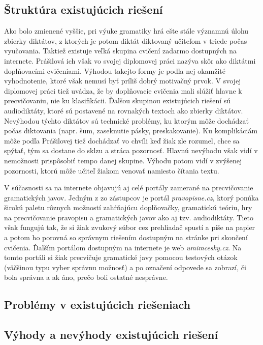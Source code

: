 \documentclass[12pt,oneside]{fithesis2}
\begin{document}
       		\subsection{Štruktúra existujúcich riešení}
       				\par Ako bolo zmienené vyššie, pri výuke gramatiky hrá ešte stále významnú úlohu zbierky diktátov, z ktorých je potom diktát diktovaný učiteľom v triede počas vyučovania. Taktiež existuje veľká skupina cvičení zadarmo dostupných na internete. Prášilová\cite{prasilova14} ich však vo svojej diplomovej práci nazýva skôr ako diktátmi doplňovacími cvičeniami. Výhodou takejto formy je podľa nej okamžité vyhodnotenie, ktoré však nemusí byť príliš dobrý motivačný prvok. V svojej diplomovej práci tiež uvádza, že by doplňovacie cvičenia mali slúžiť hlavne k precvičovaniu, nie ku klasifikácii. Ďalšou skupinou existujúcich riešení sú audiodiktáty, ktoré sú postavené na rovnakých textoch ako zbierky diktátov. Nevýhodou týchto diktátov sú technické problémy, ku ktorým môže dochádzať počas diktovania (napr. šum, zaseknutie pásky, preskakovanie). Ku komplikáciám môže podľa Prášilovej tiež dochádzať vo chvíli keď žiak zle rozumel, chce sa spýtať, tým sa dostane do sklzu a stráca pozornosť. Hlavnú nevýhodu však vidí v nemožnosti prispôsobiť tempo danej skupine. Výhodu potom vidí v zvýšenej pozornosti, ktorú môže učiteľ žiakom venovať namiesto čítania textu.
		\par V súčasnosti sa na internete objavujú aj celé portály zamerané na precvičovanie gramatických javov. Jedným z zo zástupcov je portál \textit{pravopisne.cz}, ktorý ponúka širokú paletu rôznych možností zahŕňajúcu doplňovačky, gramatickú teóriu, hry na precvičovanie pravopisu a gramatických javov ako aj tzv. audiodiktáty. Tieto však fungujú tak, že si žiak zvukový súbor cez prehliadač spustí a píše na papier a potom ho porovná so správnym riešením dostupným na stránke pri skončení cvičenia. Ďalším portálom dostupným na internete je web \textit{umimcesky.cz}. Na tomto portáli si žiak precvičuje gramatické javy pomocou testových otázok (väčšinou typu vyber správnu možnosť) a po označení odpovede sa zobrazí, či bola správna a ak áno, prečo boli ostatné nesprávne.
		
       		\subsection{Problémy v existujúcich riešeniach}
       		\subsection{Výhody a nevýhody existujúcich riešení}
\end{document}
